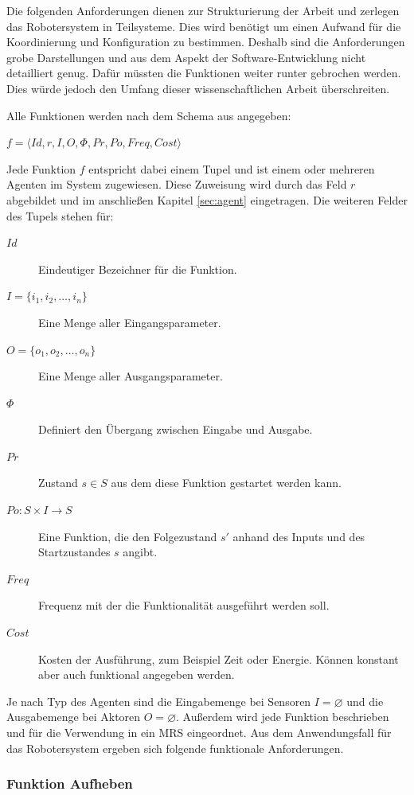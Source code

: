  Die folgenden Anforderungen dienen zur Strukturierung der Arbeit und zerlegen das Robotersystem in Teilsysteme. Dies wird benötigt um einen Aufwand für die Koordinierung und Konfiguration zu bestimmen. Deshalb sind die Anforderungen grobe Darstellungen und aus dem Aspekt der Software-Entwicklung nicht detailliert genug. Dafür müssten die Funktionen weiter runter gebrochen werden. Dies würde jedoch den Umfang dieser wissenschaftlichen Arbeit überschreiten.

Alle Funktionen werden nach dem Schema aus \cite{lundh2006plan} angegeben: 

$f = \langle  Id, r, I, O, \Phi, Pr, Po, Freq, Cost\rangle$

Jede Funktion $f$ entspricht dabei einem Tupel und ist einem oder mehreren Agenten im System zugewiesen. Diese Zuweisung wird durch das Feld $r$ abgebildet und im anschließen Kapitel \ref{sec:agent} eingetragen. Die weiteren Felder des Tupels stehen für:

\begin{description}
	\item [$Id$] Eindeutiger Bezeichner für die Funktion.
	\item [$I = \{i_1, i_2,\ldots,i_n\}$] Eine Menge aller Eingangsparameter.
	\item [$O = \{o_1, o_2,\ldots,o_n\}$] Eine Menge aller Ausgangsparameter.
	\item[$\Phi$] Definiert den Übergang zwischen Eingabe und Ausgabe.
	\item [$Pr$] Zustand $s \in S$ aus dem diese Funktion gestartet werden kann.
	\item [$Po : S \times I \rightarrow S$] Eine Funktion, die den Folgezustand $s'$ anhand des Inputs und des Startzustandes $s$ angibt.
	\item[$Freq$] Frequenz mit der die Funktionalität ausgeführt werden soll.
	\item[$Cost$] Kosten der Ausführung, zum Beispiel Zeit oder Energie. Können konstant aber auch funktional angegeben werden.
\end{description}

Je nach Typ des Agenten sind die Eingabemenge bei Sensoren $I = \varnothing$ und die Ausgabemenge bei Aktoren $O =  \varnothing$. Außerdem wird jede Funktion beschrieben und für die Verwendung in ein MRS eingeordnet. Aus dem Anwendungsfall für das Robotersystem ergeben sich folgende funktionale Anforderungen.

\subsubsection{Funktion Aufheben}


